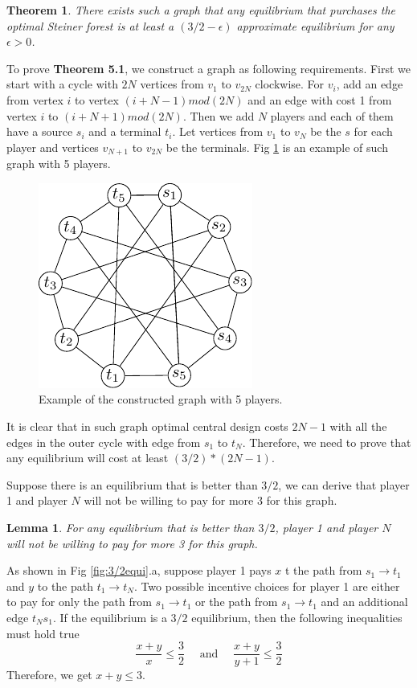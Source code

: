 \documentclass[11pt,psfig,times]{article}
\newtheorem{theorem}{Theorem}[section]
\newtheorem{lemma}{Lemma}[section]
\begin{document}
	\begin{theorem}
		There exists such a graph that any equilibrium that purchases the optimal Steiner forest is at least a $(3/2-\epsilon)$ approximate equilibrium for any $\epsilon > 0$.
	\end{theorem}
	
	To prove \textbf{Theorem 5.1}, we construct a graph as following requirements. First we start with a cycle with $2N$ vertices from $v_1 \text{ to } v_{2N}$ clockwise. For $v_i$, add an edge from vertex $i$ to vertex $(i+N-1)mod (2N)$ and an edge with cost 1 from vertex $i$ to $(i+N+1)mod (2N)$. Then we add $N$ players and each of them have a source $s_i$ and a terminal $t_i$. Let vertices from $v_1$ to $v_N$ be the $s$ for each player and vertices $v_{N+1}$ to $v_{2N}$ be the terminals.	Fig \ref{fig:generalgame} is an example of such graph with 5 players.
			   
	\begin{figure}[H]
		\begin{center}
			\includegraphics{pictures/generalcase.pdf}
		\end{center}
		\caption{ Example of the constructed graph with 5 players.}
		\label{fig:generalgame}
	\end{figure}

	It is clear that in such graph optimal central design costs $2N-1$ with all the edges in the outer cycle with edge from $s_1$ to $t_N$. Therefore, we need to prove that any equilibrium will cost at least $(3/2)*(2N-1)$.
	
	Suppose there is an equilibrium that is better than $3/2$, we can derive that player 1 and player $N$ will not be willing to pay for more 3 for this graph. 

	\begin{lemma}
		For any equilibrium that is better than $3/2$, player 1 and player $N$ will not be willing to pay for more 3 for this graph.
	\end{lemma}
	As shown in Fig \ref{fig:3/2equi}.a, suppose player 1 pays $x$ t the path from $s_1 \rightarrow t_1$ and $y$ to the path $t_1 \rightarrow t_N$. Two possible incentive choices for player 1 are either to pay for only the path from $s_1 \rightarrow t_1$ or the path from $s_1 \rightarrow t_1$ and an additional edge $t_Ns_1$. If the equilibrium is a $3/2$ equilibrium, then the following inequalities must hold true \[\frac{x+y}{x} \leq \frac{3}{2}\quad \text{ and }\quad\frac{x+y}{y+1} \leq \frac{3}{2}\]
	Therefore, we get $x+y\leq 3$.
	
\end{document}
